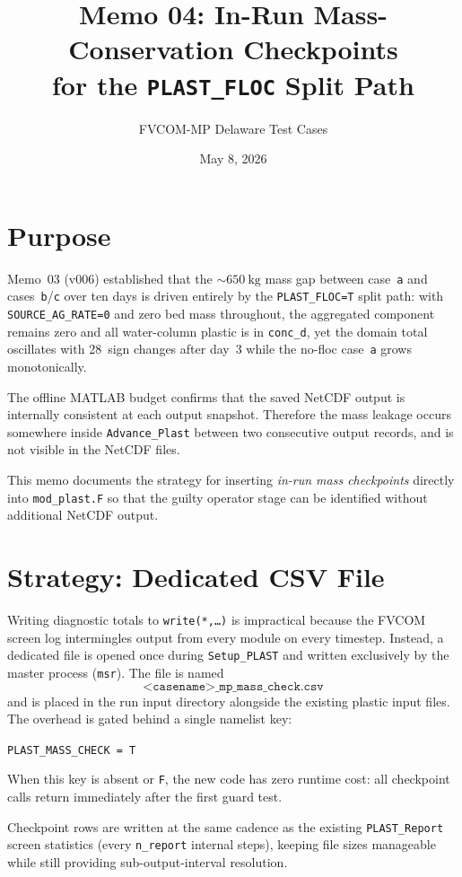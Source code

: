 \documentclass[11pt]{article}
\title{Memo 04: In-Run Mass-Conservation Checkpoints\\
       for the \texttt{PLAST\_FLOC} Split Path}
\author{FVCOM-MP Delaware Test Cases}
\date{May 8, 2026}
\begin{document}
\sloppy
\maketitle

\section*{Purpose}

Memo~03 (v006) established that the \(\sim\!650~\mathrm{kg}\) mass gap between
case~\texttt{a} and cases~\texttt{b}/\texttt{c} over ten days is driven entirely
by the \texttt{PLAST\_FLOC=T} split path: with \texttt{SOURCE\_AG\_RATE=0} and
zero bed mass throughout, the aggregated component remains zero and all water-column
plastic is in \texttt{conc\_d}, yet the domain total oscillates with 28~sign changes
after day~3 while the no-floc case~\texttt{a} grows monotonically.

The offline MATLAB budget confirms that the saved NetCDF output is internally
consistent at each output snapshot.  Therefore the mass leakage occurs somewhere
inside \texttt{Advance\_Plast} between two consecutive output records, and is not
visible in the NetCDF files.

This memo documents the strategy for inserting \emph{in-run mass checkpoints}
directly into \texttt{mod\_plast.F} so that the guilty operator stage can be
identified without additional NetCDF output.

\section*{Strategy: Dedicated CSV File}

Writing diagnostic totals to \texttt{write(*,\ldots)} is impractical because
the FVCOM screen log intermingles output from every module on every timestep.
Instead, a dedicated file is opened once during \texttt{Setup\_PLAST} and written
exclusively by the master process (\texttt{msr}).  The file is named
\[
  \texttt{<casename>\_mp\_mass\_check.csv}
\]
and is placed in the run input directory alongside the existing plastic input files.
The overhead is gated behind a single namelist key:
\begin{center}
  \texttt{PLAST\_MASS\_CHECK = T}
\end{center}
When this key is absent or \texttt{F}, the new code has zero runtime cost: all
checkpoint calls return immediately after the first guard test.

Checkpoint rows are written at the same cadence as the existing \texttt{PLAST\_Report}
screen statistics (every \texttt{n\_report} internal steps), keeping file sizes
manageable while still providing sub-output-interval resolution.
\end{document}
